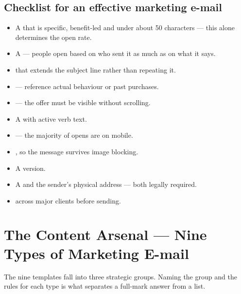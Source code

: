 \subsection{Checklist for an effective marketing e-mail}

\begin{itemize}
\item A  that is specific, benefit-led and under about 50
      characters --- this alone determines the open rate.
\item A  --- people open based on who
      sent it as much as on what it says.
\item {} that extends the subject line rather than repeating
      it.
\item {} --- reference actual behaviour
      or past purchases.
\item {} --- the offer must be visible without scrolling.
\item A  with active verb text.
\item {} --- the majority of opens are on
      mobile.
\item {}, so the message survives image blocking.
\item A  version.
\item A  and the sender's physical address --- both
      legally required.
\item {} across major clients before sending.
\end{itemize}

\section{The Content Arsenal --- Nine Types of Marketing E-mail}

\begin{keybox}
The nine templates fall into three strategic groups. Naming the group and the
rules for each type is what separates a full-mark answer from a list.
\end{keybox}

